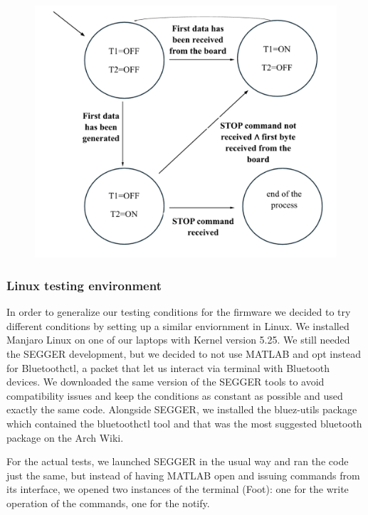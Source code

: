 \documentclass{Configuration_Files/PoliMi3i_thesis}
\begin{document}
\begin{figure}[H]
    \centering
    \includegraphics[scale=0.2]{Board Windows PC/11.png}
    \label{fig:nrf_connect_log}
\end{figure}

\subsubsection{Linux testing environment}

In order to generalize our testing conditions for the firmware we decided to try different conditions by setting up a similar enviornment in Linux.
We installed Manjaro Linux on one of our laptops with Kernel version 5.25.
We still needed the SEGGER development, but we decided to not use MATLAB and opt instead for Bluetoothctl, a packet that let us interact via terminal with Bluetooth devices.
We downloaded the same version of the SEGGER tools to avoid compatibility issues and keep the conditions as constant as possible and used exactly the same code.
Alongside SEGGER, we installed the bluez-utils package which contained the bluetoothctl tool and that was the most suggested bluetooth package on the Arch Wiki.

For the actual tests, we launched SEGGER in the usual way and ran the code just the same, but instead of having MATLAB open and issuing commands from its interface, we opened two instances of the terminal (Foot): one for the write operation of the commands, one for the notify.
\end{document}
